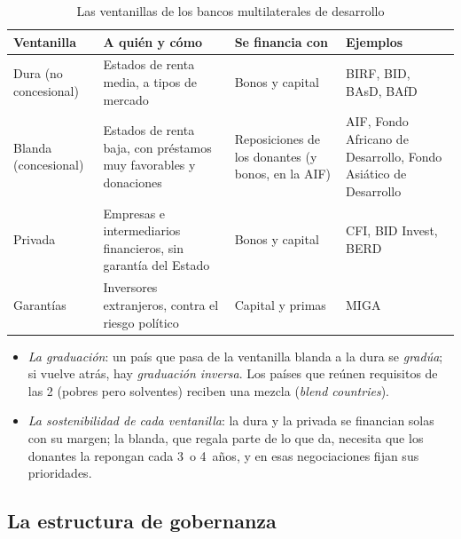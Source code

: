 \documentclass[11pt]{article}
\begin{document}
\begin{table}[H]
\centering
\caption{Las ventanillas de los bancos multilaterales de desarrollo}\label{tab:ventanillas}
\small
\begin{tabular}{>{\raggedright\arraybackslash}m{3.2cm}>{\raggedright\arraybackslash}m{3.9cm}>{\raggedright\arraybackslash}m{3.2cm}>{\raggedright\arraybackslash}m{3.6cm}}
\toprule
\rowcolor{tceeazulpalido} Ventanilla & A quién y cómo & Se financia con & Ejemplos \\
\midrule
Dura (no concesional) & Estados de renta media, a tipos de mercado & Bonos y capital & BIRF, BID, BAsD, BAfD \\
Blanda (concesional) & Estados de renta baja, con préstamos muy favorables y donaciones & Reposiciones de los donantes (y bonos, en la AIF) & AIF, Fondo Africano de Desarrollo, Fondo Asiático de Desarrollo \\
Privada & Empresas e intermediarios financieros, sin garantía del Estado & Bonos y capital & CFI, BID Invest, BERD \\
Garantías & Inversores extranjeros, contra el riesgo político & Capital y primas & MIGA \\
\bottomrule
\end{tabular}
\end{table}

\begin{itemize}
\item \emph{La graduación}: un país que pasa de la ventanilla blanda a la dura se \emph{gradúa}; si vuelve atrás, hay \emph{graduación inversa}. Los países que reúnen requisitos de las 2 (pobres pero solventes) reciben una mezcla (\emph{blend countries}).
\item \emph{La sostenibilidad de cada ventanilla}: la dura y la privada se financian solas con su margen; la blanda, que regala parte de lo que da, necesita que los donantes la repongan cada 3~o 4~años, y en esas negociaciones fijan sus prioridades.
\end{itemize}

\subsection{La estructura de gobernanza}\label{sec:gobernanza}
\end{document}
